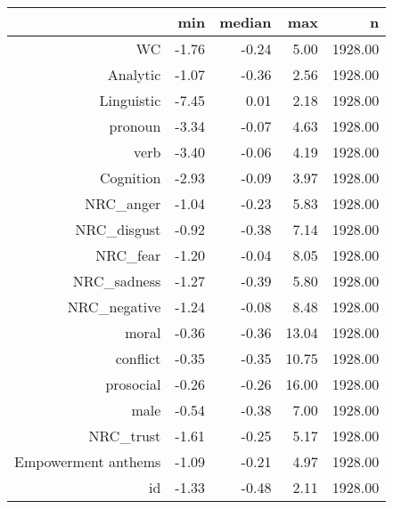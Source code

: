 \begin{table}[ht]
\centering
\begin{tabular}{rrrrr}
  \hline
 & min & median & max & n \\ 
  \hline
WC & -1.76 & -0.24 & 5.00 & 1928.00 \\ 
  Analytic & -1.07 & -0.36 & 2.56 & 1928.00 \\ 
  Linguistic & -7.45 & 0.01 & 2.18 & 1928.00 \\ 
  pronoun & -3.34 & -0.07 & 4.63 & 1928.00 \\ 
  verb & -3.40 & -0.06 & 4.19 & 1928.00 \\ 
  Cognition & -2.93 & -0.09 & 3.97 & 1928.00 \\ 
  NRC\_anger & -1.04 & -0.23 & 5.83 & 1928.00 \\ 
  NRC\_disgust & -0.92 & -0.38 & 7.14 & 1928.00 \\ 
  NRC\_fear & -1.20 & -0.04 & 8.05 & 1928.00 \\ 
  NRC\_sadness & -1.27 & -0.39 & 5.80 & 1928.00 \\ 
  NRC\_negative & -1.24 & -0.08 & 8.48 & 1928.00 \\ 
  moral & -0.36 & -0.36 & 13.04 & 1928.00 \\ 
  conflict & -0.35 & -0.35 & 10.75 & 1928.00 \\ 
  prosocial & -0.26 & -0.26 & 16.00 & 1928.00 \\ 
  male & -0.54 & -0.38 & 7.00 & 1928.00 \\ 
  NRC\_trust & -1.61 & -0.25 & 5.17 & 1928.00 \\ 
  Empowerment anthems & -1.09 & -0.21 & 4.97 & 1928.00 \\ 
  id & -1.33 & -0.48 & 2.11 & 1928.00 \\ 
   \hline
\end{tabular}
\end{table}
